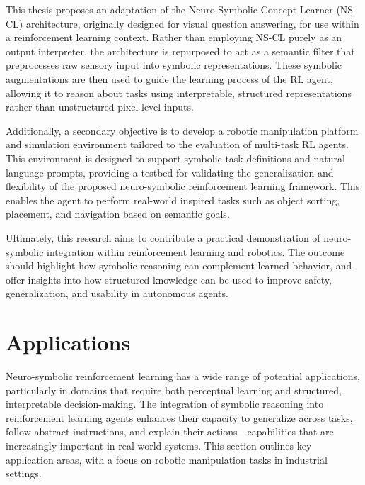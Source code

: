 This thesis proposes an adaptation of the Neuro-Symbolic Concept Learner (NS-CL) architecture, originally designed for visual question answering, for use within a reinforcement learning context. Rather than employing NS-CL purely as an output interpreter, the architecture is repurposed to act as a semantic filter that preprocesses raw sensory input into symbolic representations. These symbolic augmentations are then used to guide the learning process of the RL agent, allowing it to reason about tasks using interpretable, structured representations rather than unstructured pixel-level inputs.

Additionally, a secondary objective is to develop a robotic manipulation platform and simulation environment tailored to the evaluation of multi-task RL agents. This environment is designed to support symbolic task definitions and natural language prompts, providing a testbed for validating the generalization and flexibility of the proposed neuro-symbolic reinforcement learning framework. This enables the agent to perform real-world inspired tasks such as object sorting, placement, and navigation based on semantic goals.

Ultimately, this research aims to contribute a practical demonstration of neuro-symbolic integration within reinforcement learning and robotics. The outcome should highlight how symbolic reasoning can complement learned behavior, and offer insights into how structured knowledge can be used to improve safety, generalization, and usability in autonomous agents.

%

\section{Applications} \label{se:applications}
Neuro-symbolic reinforcement learning has a wide range of potential applications, particularly in domains that require both perceptual learning and structured, interpretable decision-making. The integration of symbolic reasoning into reinforcement learning agents enhances their capacity to generalize across tasks, follow abstract instructions, and explain their actions—capabilities that are increasingly important in real-world systems. This section outlines key application areas, with a focus on robotic manipulation tasks in industrial settings.

